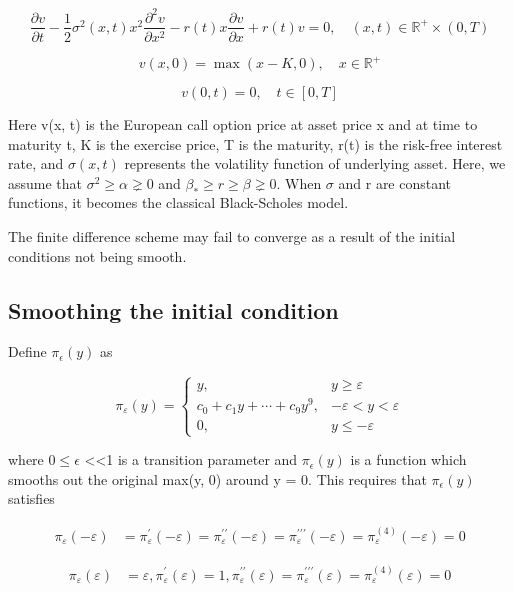 $$\frac{\partial v}{\partial t}-\frac{1}{2} \sigma^{2}(x, t) x^{2} \frac{\partial^{2} v}{\partial x^{2}}-r(t) x \frac{\partial v}{\partial x}+r(t) v=0, \quad(x, t) \in \mathbb{R}^{+} \times(0, T)$$

$$v(x, 0)=\max (x-K, 0), \quad x \in \mathbb{R}^{+}$$

$$v(0, t)=0, \quad t \in[0, T]$$

Here v(x, t) is the European call option price at asset price x and at time to maturity t, K is the exercise price, T is the maturity, r(t) is the risk-free interest rate, and $\sigma(x, t)$ represents the volatility function of underlying asset. Here, we assume that $\sigma^{2} \geq \alpha \gneq 0$ and $\beta_{*} \geq r \geq \beta \gneq 0$. When $\sigma$ and r are constant functions, it becomes the classical Black-Scholes model.

The finite difference scheme may fail to converge as a result of the initial conditions not being smooth.

\subsection{Smoothing the initial condition}
Define $\pi_{\epsilon}(y)$ as

$$
\pi_{\varepsilon}(y)= \begin{cases}y, & y \geq \varepsilon \\ c_{0}+c_{1} y+\cdots+c_{9} y^{9}, & -\varepsilon<y<\varepsilon \\
0, & y \leq-\varepsilon\end{cases}
$$


where $0 \leq \epsilon$ \textless\textless 1 is a transition parameter and $\pi_{\epsilon}(y)$ is a function which smooths out the original max(y, 0) around y = 0. This requires that $\pi_{\epsilon}(y)$ satisfies

$$
\begin{aligned}
\pi_{\varepsilon}(-\varepsilon) &=\pi_{\varepsilon}^{\prime}(-\varepsilon)=\pi_{\varepsilon}^{\prime \prime}(-\varepsilon)=\pi_{\varepsilon}^{\prime \prime \prime}(-\varepsilon)=\pi_{\varepsilon}^{(4)}(-\varepsilon)=0 
\end{aligned}
$$

$$
\begin{aligned}
\pi_{\varepsilon}(\varepsilon) &=\varepsilon, \pi_{\varepsilon}^{\prime}(\varepsilon)=1, \pi_{\varepsilon}^{\prime \prime}(\varepsilon)=\pi_{\varepsilon}^{\prime \prime \prime}(\varepsilon)=\pi_{\varepsilon}^{(4)}(\varepsilon)=0
\end{aligned}
$$

